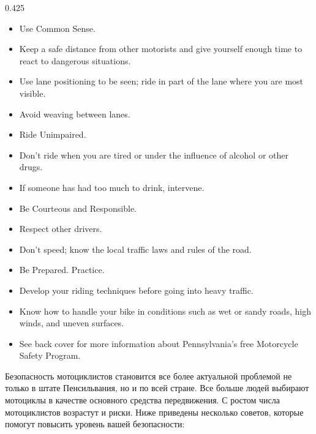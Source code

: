 \begin{langblock}{0.425}
\begin{eng}
\begin{itemize}[nosep]
	\item Use Common Sense.
	\item Keep a safe distance from other motorists and give yourself enough time to react to dangerous situations.
	\item Use lane positioning to be seen; ride in part of the lane where you are most visible.
	\item Avoid weaving between lanes.
	
\end{itemize}
\bigskip
\begin{itemize}[nosep]
	\item Ride Unimpaired.
	\item Don't ride when you are tired or under the influence of alcohol or other drugs.
	\item If someone has had too much to drink, intervene.
	
\end{itemize}
\bigskip
\begin{itemize}[nosep]
	\item Be Courteous and Responsible.
	\item Respect other drivers.
	\item Don't speed; know the local traffic laws and rules of the road.
\end{itemize}
\bigskip
\begin{itemize}[nosep]
	
	\item Be Prepared. Practice.
	\item Develop your riding techniques before going into heavy traffic.
	\item Know how to handle your bike in conditions such as wet or sandy roads, high winds, and uneven surfaces.
	\item See back cover for more information about Pennsylvania's free Motorcycle Safety Program.
	
\end{itemize}


	\end{eng}
	\begin{rus}

		
		Безопасность мотоциклистов становится все более актуальной проблемой не только в штате Пенсильвания, но и по всей стране. Все больше людей выбирают мотоциклы в качестве основного средства передвижения. С ростом числа мотоциклистов возрастут и риски. Ниже приведены несколько советов, которые помогут повысить уровень вашей безопасности:


\end{rus}
\end{langblock}
